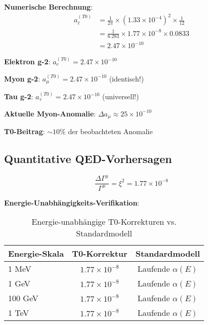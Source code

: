 \documentclass[12pt,a4paper]{article}
\newcommand{\xipar}{\xi}
\theoremstyle{definition}
\theoremstyle{remark}
\begin{document}
	\textbf{Numerische Berechnung}:
	\begin{align}
		a_{\ell}^{(T0)} &= \frac{1}{2\pi} \times (1.33 \times 10^{-4})^2 \times \frac{1}{12} \\
		&= \frac{1}{6.283} \times 1.77 \times 10^{-8} \times 0.0833 \\
		&= 2.47 \times 10^{-10}
	\end{align}
	
	\begin{tcolorbox}[colback=blue!5!white,colframe=blue!75!black,title=Universelle Lepton-Vorhersage]
		\textbf{Elektron g-2}: $a_e^{(T0)} = 2.47 \times 10^{-10}$
		
		\textbf{Myon g-2}: $a_{\mu}^{(T0)} = 2.47 \times 10^{-10}$ (identisch!)
		
		\textbf{Tau g-2}: $a_{\tau}^{(T0)} = 2.47 \times 10^{-10}$ (universell!)
		
		\textbf{Aktuelle Myon-Anomalie}: $\Delta a_{\mu} \approx 25 \times 10^{-10}$
		
		\textbf{T0-Beitrag}: $\sim 10\%$ der beobachteten Anomalie
	\end{tcolorbox}
	
	\subsection{Quantitative QED-Vorhersagen}
	
	\begin{equation}
		\frac{\Delta\Gamma^{\mu}}{\Gamma^{\mu}} = \xipar^2 = 1.77 \times 10^{-8}
		\label{eq:quantitative_qed_correction}
	\end{equation}
	
	\textbf{Energie-Unabhängigkeits-Verifikation}:
	\begin{table}[htbp]
		\centering
		\begin{tabular}{lcc}
			\toprule
			\textbf{Energie-Skala} & \textbf{T0-Korrektur} & \textbf{Standardmodell} \\
			\midrule
			1 MeV & $1.77 \times 10^{-8}$ & Laufende $\alpha(E)$ \\
			1 GeV & $1.77 \times 10^{-8}$ & Laufende $\alpha(E)$ \\
			100 GeV & $1.77 \times 10^{-8}$ & Laufende $\alpha(E)$ \\
			1 TeV & $1.77 \times 10^{-8}$ & Laufende $\alpha(E)$ \\
			\bottomrule
		\end{tabular}
		\caption{Energie-unabhängige T0-Korrekturen vs. Standardmodell}
	\end{table}
	
\end{document}
